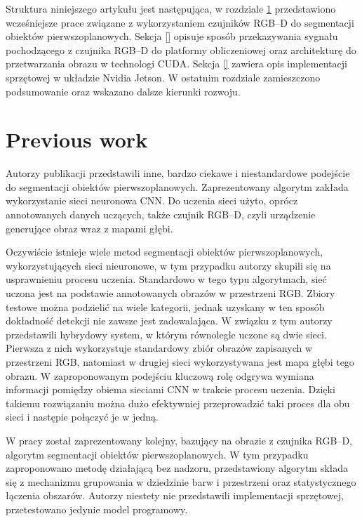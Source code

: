\documentclass[b5paper,10pt,twoside]{article}
\begin{document}
{Struktura niniejszego artykułu jest następująca, w rozdziale \ref{sec:prev_work} przedstawiono wcześniejsze prace związane z wykorzystaniem czujników RGB--D do segmentacji obiektów pierwszoplanowych. Sekcja \ref{} opisuje sposób przekazywania sygnału pochodzącego z czujnika RGB--D do platformy obliczeniowej oraz architekturę do przetwarzania obrazu w technologi CUDA. Sekcja \ref{} zawiera opis implementacji sprzętowej w układzie Nvidia Jetson. W ostatnim rozdziale zamieszczono podsumowanie oraz wskazano dalsze kierunki rozwoju.   

\section{Previous work}
\label{sec:prev_work}

Autorzy publikacji \cite{Hoffman_2016} przedstawili inne, bardzo ciekawe i niestandardowe podejście do segmentacji obiektów pierwszoplanowych. 
Zaprezentowany algorytm zakłada wykorzystanie sieci neuronowa CNN. 
Do uczenia sieci użyto, oprócz annotowanych danych uczących, także czujnik RGB--D, czyli urządzenie generujące obraz wraz z mapami głębi. 

Oczywiście istnieje wiele metod segmentacji obiektów pierwszoplanowych, wykorzystujących sieci nieuronowe, w tym przypadku autorzy skupili się na usprawnieniu procesu uczenia. 
Standardowo w tego typu algorytmach, sieć uczona jest na podstawie annotowanych obrazów w przestrzeni RGB. 
Zbiory testowe można podzielić na wiele kategorii, jednak uzyskany w ten sposób dokładność detekcji nie zawsze jest zadowalająca. 
W związku z tym autorzy przedstawili hybrydowy system, w którym równolegle uczone są dwie sieci. 
Pierwsza z nich wykorzystuje standardowy zbiór obrazów zapisanych w przestrzeni RGB, natomiast w drugiej sieci wykorzystywana jest mapa głębi tego obrazu. W zaproponowanym podejściu kluczową rolę odgrywa wymiana informacji pomiędzy obiema sieciami CNN w trakcie procesu uczenia. 
Dzięki takiemu rozwiązaniu można dużo efektywniej przeprowadzić taki proces dla obu sieci i następie połączyć je w jedną. 

W pracy \cite{Hasnat_2014} został zaprezentowany kolejny, bazujący na obrazie z czujnika RGB--D, algorytm segmentacji obiektów pierwszoplanowych. W tym przypadku zaproponowano metodę działającą bez nadzoru, przedstawiony algorytm składa się z mechanizmu grupowania w dziedzinie barw i przestrzeni oraz statystycznego łączenia obszarów. Autorzy niestety nie przedstawili implementacji sprzętowej, przetestowano jedynie model programowy.

}
\end{document}
